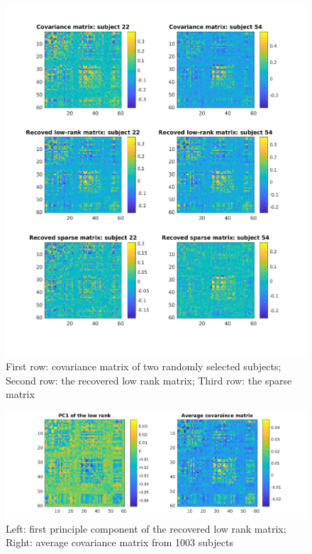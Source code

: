 \documentclass[12pt]{extarticle}
\newcommand{\<}{\langle}
\renewcommand{\>}{\rangle}
\theoremstyle{definition}
\begin{document}
\begin{figure}
    \centering
    \includegraphics[width=\textwidth]{Example_HCP.png}
    \caption{First row: covariance matrix of two randomly selected subjects; Second row: the recovered low rank matrix; Third row: the sparse matrix}
    \label{ex_HCP}
\end{figure}

\begin{figure}
    \centering
    \includegraphics[width=\textwidth]{PC_Avg_HCP.png}
    \caption{Left: first principle component of the recovered low rank matrix; Right: average covariance matrix from 1003 subjects}
    \label{pc}
\end{figure}
\end{document}
